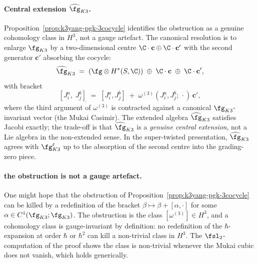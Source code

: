 \paragraph{Central extension \texorpdfstring{$\widehat{\fg}_{K3}$}{widehatg-K3}.}
Proposition~\ref{prop:k3yang-pgk-3cocycle} identifies the
obstruction as a genuine cohomology class in $H^3$, not a gauge
artefact. The canonical resolution is to enlarge $\fg_{K3}$ by a
two-dimensional centre
$\C \cdot \mathbf c \oplus \C \cdot \mathbf c'$ with the second
generator $\mathbf c'$ absorbing the cocycle:
\begin{equation}\label{eq:k3yang-central-extension}
 \widehat{\fg}_{K3}
 \;=\;
 (\fg \otimes H^*(S, \C))
 \;\oplus\;
 \C \cdot \mathbf c
 \;\oplus\;
 \C \cdot \mathbf c',
\end{equation}
with bracket
\[
 [J^a_i,\; J^b_j]_{\widehat{}}
 \;=\;
 [J^a_i, J^b_j]
 \;+\;
 \omega^{(3)}(J^a_i, J^b_j;\, \cdot)\, \mathbf c',
\]
where the third argument of $\omega^{(3)}$ is contracted against a
canonical $\fg_{K3}$-invariant vector (the Mukai Casimir). The
extended algebra $\widehat{\fg}_{K3}$ satisfies Jacobi exactly; the
trade-off is that $\widehat{\fg}_{K3}$ is a \emph{genuine central
extension}, not a Lie algebra in the non-extended sense. In the
super-twisted presentation, $\widehat{\fg}_{K3}$ agrees with
$\fg^{\varepsilon}_{K3}$ up to the absorption of the second centre
into the grading-zero piece.

\paragraph{the obstruction is not a gauge artefact.}
One might hope that the obstruction of
Proposition~\ref{prop:k3yang-pgk-3cocycle} can be killed by a
redefinition of the bracket
$\beta \mapsto \beta + [\alpha, \cdot]$ for some
$\alpha \in C^1(\fg_{K3}; \fg_{K3})$. The obstruction is the class
$[\omega^{(3)}] \in H^3$, and a cohomology class is gauge-invariant
by definition: no redefinition of the $\hbar$-expansion at order
$\hbar$ or $\hbar^2$ can kill a non-trivial class in $H^3$. The
$\fsl_2$-computation of the proof shows the class is non-trivial
whenever the Mukai cubic does not vanish, which holds generically.

